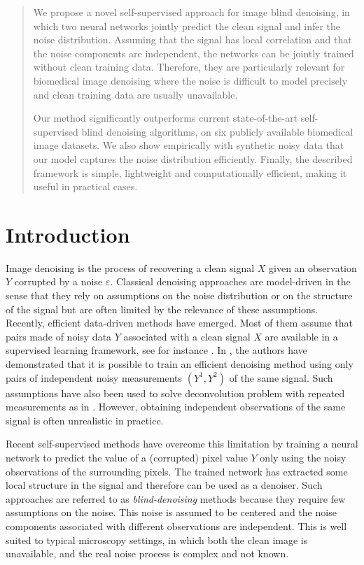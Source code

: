 \documentclass{article}
\begin{document}
\begin{abstract}
We propose a novel self-supervised approach for image blind denoising, in which two neural networks jointly predict the clean signal and infer the noise distribution.
Assuming that the signal has local correlation and that the noise components are independent, the networks can be jointly trained without clean training data. Therefore, they are particularly relevant for biomedical image denoising where the noise is difficult to model precisely and clean training data are usually unavailable.

Our method significantly outperforms current state-of-the-art self-supervised blind denoising algorithms, on six publicly available biomedical image datasets. We also show empirically with synthetic noisy data that our model captures the noise distribution efficiently. Finally, the described framework is simple, lightweight and computationally efficient, making it useful in practical cases.
\end{abstract}

\section{Introduction}
\label{sec:introduction}

Image denoising is the process of recovering a clean signal $X$ given an observation $Y$ corrupted by a noise $\varepsilon$. Classical denoising approaches  are model-driven in the sense that they rely on assumptions on the noise distribution or on the structure of the signal but are often  limited by the relevance of these assumptions.
Recently, efficient data-driven methods have emerged. Most of them assume that pairs made of noisy data $Y$ associated with a clean signal $X$ are available in a supervised learning framework, see for instance \cite{weigert2017content}. In \cite{lehtinen2018noise2noise}, the authors have demonstrated that it is possible to train an efficient denoising method using only pairs of independent noisy measurements $(Y^1, Y^2)$ of the same signal. Such assumptions have also been used to solve deconvolution problem with repeated measurements as in \cite{delaigle2008deconvolution}. However, obtaining  independent observations of the same signal is often unrealistic in practice.

Recent self-supervised methods have overcome this limitation \cite{batson2019noise2self,krull2018noise2void} by training a neural network to predict the value of a (corrupted) pixel value $Y$ only using the noisy observations of the surrounding pixels. The trained network has extracted some local structure in the signal and therefore can be used as a denoiser. Such approaches are referred to as \textit{blind-denoising} methods because they require few assumptions on the noise. This noise is assumed to be centered and the noise components associated with different observations are independent. This is well suited to typical microscopy settings, in which both the clean image is unavailable, and the real noise process is complex and not known.
\end{document}
